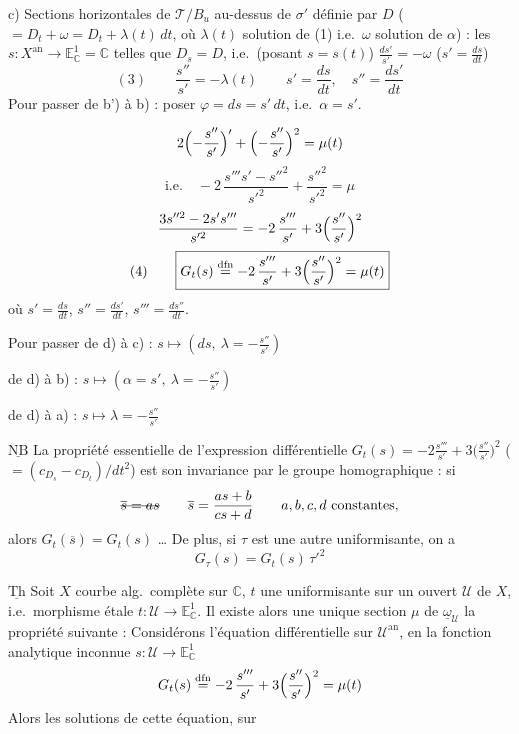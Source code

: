 \documentclass[11pt,a4paper]{article}
\begin{document}
c) Sections horizontales de $\mathcal{T}/B_u$ \struck{\ill{}} au-dessus de $\sigma'$ définie par $D$ ($=D_t+\omega=D_t+\lambda(t)\,dt$, où $\lambda(t)$ solution de (1) i.e.\ $\omega$ solution de $\alpha$) : les $s:X^{\mathrm{an}}\to\mathbb{E}^1_{\mathbb{C}}=\mathbb{C}$ telles que $D_s=D$, i.e.\ (posant $s=s(t)$)  $\frac{ds'}{s'}=-\omega$ ($s'=\frac{ds}{dt}$)
\[
(3)\qquad\frac{s''}{s'}=-\lambda(t)\qquad s'=\frac{ds}{dt},\quad s''=\frac{ds'}{dt}
\]
Pour passer de b') à b) : poser $\varphi=ds=s'\,dt$, i.e.\ $\boxed{\alpha=s'}$.

\[
2\Bigl(-\frac{s''}{s'}\Bigr)'+\Bigl(-\frac{s''}{s'}\Bigr)^2=\mu(t)
\]
\[
\text{i.e.}\quad -2\,\frac{s'''s'-s''^2}{s'^2}+\frac{s''^2}{s'^2}=\mu
\]
\[
\frac{3s''^2-2s's'''}{s'^2}=-2\,\frac{s'''}{s'}+3\Bigl(\frac{s''}{s'}\Bigr)^2
\]
\[
(4)\qquad\boxed{G_t(s)\overset{\mathrm{dfn}}{=}-2\,\frac{s'''}{s'}+3\Bigl(\frac{s''}{s'}\Bigr)^2=\mu(t)}
\]
où $s'=\frac{ds}{dt}$, $s''=\frac{ds'}{dt}$, $s'''=\frac{ds''}{dt}$.

Pour passer de d) à c) : $s\longmapsto(ds,\ \lambda=-\frac{s''}{s'})$

\qquad de d) à b) : $s\longmapsto(\alpha=s',\ \lambda=-\frac{s''}{s'})$

\qquad de d) à a) : $s\longmapsto\lambda=-\frac{s''}{s'}$

$\underline{\text{NB}}$ La propriété essentielle de l'expression différentielle $G_t(s)=-2\frac{s'''}{s'}+3\bigl(\frac{s''}{s'}\bigr)^2$  ($=(c_{D_s}-c_{D_t})/dt^2$) est son invariance par le groupe homographique : si
\[
\text{\struck{$\overline{s}=as$}}\qquad\overline{s}=\frac{as+b}{cs+d}\qquad a,b,c,d\ \text{constantes},
\]
alors $G_t(\overline{s})=G_t(s)$ … De plus, si $\tau$ est une autre uniformisante, on a
\[
G_\tau(s)=G_t(s)\,\tau'^2
\]

$\underline{\text{Th}}$ Soit $X$ courbe alg.\ complète sur $\mathbb{C}$, $t$ une uniformisante sur un ouvert $\mathcal{U}$ de $X$, i.e.\ morphisme étale $t:\mathcal{U}\to\mathbb{E}^1_{\mathbb{C}}$. Il existe alors une unique section $\mu$ de $\underline{\omega}_{\mathcal{U}}$  la propriété suivante : Considérons l'équation \struck{\ill{}} différentielle sur $\mathcal{U}^{\mathrm{an}}$, en la fonction analytique inconnue $s:\mathcal{U}\to\mathbb{E}^1_{\mathbb{C}}$
\[
G_t(s)\overset{\mathrm{dfn}}{=}-2\,\frac{s'''}{s'}+3\Bigl(\frac{s''}{s'}\Bigr)^2=\mu(t)
\]
Alors les solutions de cette équation, sur 
\end{document}
